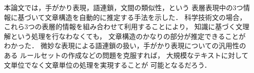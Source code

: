 本論文では，手がかり表現，語連鎖，文間の類似性，という
表層表現中の3つ情報に基づいて文章構造を自動的に推定する手法を示した．
科学技術文の場合，
これら3つの表層的情報を組み合わせて利用することにより，
知識に基づく文理解という処理を行なわなくても，
文章構造のかなりの部分が推定できることがわかった．
微妙な表現による語連鎖の扱い，手がかり表現についての汎用性のある
ルールセットの作成などの問題を克服すれば，
大規模なテキストに対して文単位でなく文章単位の処理を実現することが
可能となるだろう．






